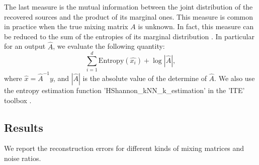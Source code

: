 \documentclass[jmlr]{article}
\theoremstyle{definition}
\begin{document}
The last measure is the mutual information between the joint distribution of the recovered sources and the product of its marginal ones. 
This measure is common in practice when the true mixing matrix $A$ is unknown. 
In fact, this measure can be reduced to the sum of the entropies of its marginal distribution \citep{Learned-Miller:2003:IUS:945365.964306}. 
In particular for an output $\hat{A}$, we evaluate the following quantity:
\begin{equation}
\sum_{i = 1}^{d} \text{Entropy}(\hat{x_i}) + \log |\hat{A}|,
\end{equation}
where $\hat{x} = \hat{A}^{-1}y$, and $|\hat{A}|$ is the absolute value of the determine of $\hat{A}$. We also use the entropy estimation function 'HShannon\_kNN\_k\_estimation' in the 'ITE' toolbox \citep{szabo14information}. 
\fi

\subsection{Results}
\label{subsubsec:results}
We report the reconstruction errors for different kinds of mixing matrices and noise ratios.
\end{document}
